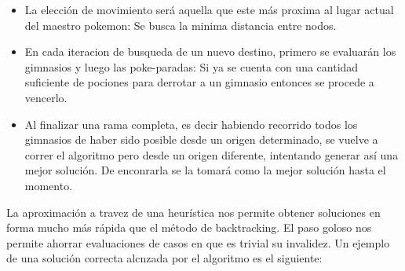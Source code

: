 \begin{itemize}
\item La elección de movimiento será aquella que este más proxima al lugar actual del maestro pokemon: Se busca la minima distancia entre nodos. 
\item En cada iteracion de busqueda de un nuevo destino, primero se evaluarán los gimnasios y luego las poke-paradas: Si ya se cuenta con una cantidad suficiente de pociones para derrotar a un gimnasio entonces se procede a vencerlo.
\item Al finalizar una rama completa, es decir habiendo recorrido todos los gimnasios de haber sido posible desde un origen determinado, se vuelve a correr el algoritmo pero desde un origen diferente, intentando generar así una mejor solución. De enconrarla se la tomará como la mejor solución hasta el momento.
\end{itemize}
 



La aproximación a travez de una heurística nos permite obtener soluciones en forma mucho más rápida que el método de backtracking. El paso goloso nos permite ahorrar evaluaciones de casos en que es trivial su invalidez. Un ejemplo de una solución correcta alcnzada por el algoritmo es el siguiente:

